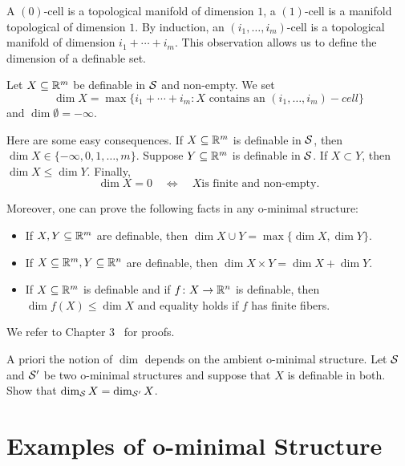 A $(0)$-cell is a topological manifold of dimension $1$, a $(1)$-cell
is a manifold topological of dimension $1$. By induction, an
$(i_1,\ldots,i_m)$-cell is a topological manifold of dimension
$i_1+\cdots+i_m$. This observation allows us to define the dimension
of a definable set.
 
\begin{definition}
  Let $X\subseteq{\mathbb{R}}^m$ be definable in ${\mathcal S}$ and non-empty. We set
  \begin{equation*}
    \dim X = \max \{i_1+\cdots+i_m: X\text{ contains an
    }(i_1,\ldots,i_m)-cell\}
  \end{equation*}
  and $\dim \emptyset=-\infty$. 
\end{definition}

\begin{remark}
  Here are some easy consequences. If $X\subseteq{\mathbb{R}}^m$ is definable in
  ${\mathcal S}$, then $\dim X \in\{-\infty,0,1,\ldots,m\}$.
  Suppose $Y\subseteq{\mathbb{R}}^m$ is definable in ${\mathcal S}$. If $X\subset Y$, then
  $\dim X\le \dim Y$. 
  Finally,
  \begin{equation*}
    \dim X = 0 \quad\Longleftrightarrow\quad \text{$X$
      is finite and non-empty.}
  \end{equation*}

  Moreover, one can prove the following facts in any o-minimal structure:
  \begin{itemize}  
  \item If $X,Y\subseteq{\mathbb{R}}^m$ are definable, then  $\dim X\cup Y = \max\{\dim X,\dim Y\}$.
  \item If $X\subseteq{\mathbb{R}}^m,Y\subseteq{\mathbb{R}}^n$ are definable, then  $\dim
    X\times Y = \dim X +\dim Y$.
  \item If $X\subseteq{\mathbb{R}}^m$ is definable and if $f\colon
    X\rightarrow{\mathbb{R}}^n$ is definable, then $\dim f(X) \le \dim X$ and
    equality holds if $f$ has finite fibers.
  \end{itemize}

  We refer to Chapter 3~\cite{D:oMin} for proofs. 
\end{remark}

\begin{exercise}
  A priori the notion of $\dim$ depends on the ambient o-minimal
  structure. Let ${\mathcal S}$ and ${\mathcal S}'$ be two o-minimal structures and
  suppose that $X$ is definable in both. Show that $\dim_{{\mathcal S}} X =
  \dim_{{\mathcal S}'} X$.
\end{exercise}

\section{Examples of o-minimal Structure}


